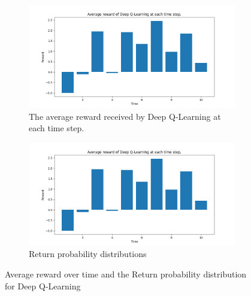 \documentclass{class}
\begin{document}
\begin{appendices}
\begin{figure}
    \centering
    \begin{subfigure}[t]{0.47\linewidth}
        \centering
        \includegraphics[width=1\linewidth]{plots/r_over_time/deep_q_learning_r_over_time.png}
        \caption{The average reward received by Deep Q-Learning at each time step.}
        \label{fig: dql over time}
    \end{subfigure}
    \begin{subfigure}[t]{0.47\linewidth}
        \centering
        \includegraphics[width=1\linewidth]{plots/r_over_time/deep_q_learning_r_over_time.png}
        \caption{Return probability distributions}
        \label{fig: dql return probability}
    \end{subfigure}
    \caption{Average reward over time and the Return probability distribution for Deep Q-Learning}
    \label{fig: dqlstuff}
\end{figure}

\end{appendices}
\end{document}
